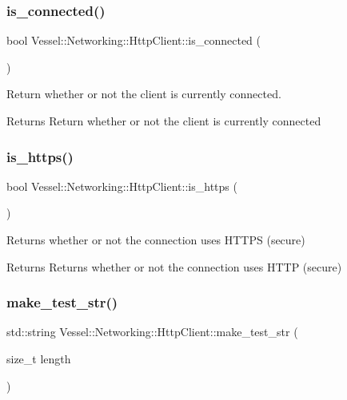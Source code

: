 \subsubsection{\texorpdfstring{is\+\_\+connected()}{is\_connected()}}
{\footnotesize\ttfamily bool Vessel\+::\+Networking\+::\+Http\+Client\+::is\+\_\+connected (\begin{DoxyParamCaption}{ }\end{DoxyParamCaption})}



Return whether or not the client is currently connected. 

\begin{DoxyReturn}{Returns}
Return whether or not the client is currently connected 
\end{DoxyReturn}
\mbox{\label{class_vessel_1_1_networking_1_1_http_client_ac6f264effcb5e9dc5804b3582467eb98}} 
\subsubsection{\texorpdfstring{is\+\_\+https()}{is\_https()}}
{\footnotesize\ttfamily bool Vessel\+::\+Networking\+::\+Http\+Client\+::is\+\_\+https (\begin{DoxyParamCaption}{ }\end{DoxyParamCaption})}



Returns whether or not the connection uses H\+T\+T\+PS (secure) 

\begin{DoxyReturn}{Returns}
Returns whether or not the connection uses H\+T\+TP (secure) 
\end{DoxyReturn}
\mbox{\label{class_vessel_1_1_networking_1_1_http_client_a3a32bbeadd12e311c4934c2841c1122d}} 
\subsubsection{\texorpdfstring{make\+\_\+test\+\_\+str()}{make\_test\_str()}}
{\footnotesize\ttfamily std\+::string Vessel\+::\+Networking\+::\+Http\+Client\+::make\+\_\+test\+\_\+str (\begin{DoxyParamCaption}\item[{size\+\_\+t}]{length }\end{DoxyParamCaption})}




